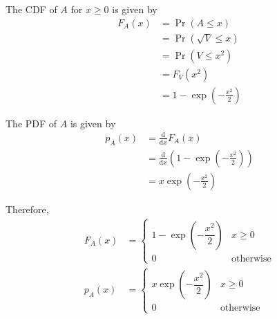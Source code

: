 \documentclass[journal,12pt,twocolumn]{IEEEtran}
\providecommand{\pr}[1]{\ensuremath{\Pr\left(#1\right)}}
\providecommand{\brak}[1]{\ensuremath{\left(#1\right)}}
\providecommand{\der}[1]{\mathrm{d} #1}
\numberwithin{equation}{section}
\renewcommand\thesection{\arabic{section}}
\begin{document}
\begin{enumerate}[label=\thesection.\arabic*,ref=\thesection.\theenumi]
	The CDF of $A$ for $x \ge 0$ is given by
	\begin{align}
		F_A(x) &= \pr{A \le x} \\
		&= \pr{\sqrt{V} \le x} \\
		&= \pr{V \le x^2} \\
		&= F_V(x^2) \\
		&= 1 - \exp\brak{-\frac{x^2}{2}}
	\end{align}
	
	The PDF of $A$ is given by
	\begin{align}
		p_A(x) &= \frac{\der{}}{\der{x}} F_A(x) \\
		&= \frac{\der{}}{\der{x}} \brak{1 - \exp\brak{-\frac{x^2}{2}}} \\
		&= x \exp\brak{-\frac{x^2}{2}}
	\end{align}
	
	Therefore,
	\begin{align}
		F_A(x) &= 
		\begin{cases}
			1 - \exp\brak{-\dfrac{x^2}{2}} & x \geq 0 \\
			0 & \text{otherwise}
		\end{cases}	\\
		p_A(x) &= 
		\begin{cases}
			x \exp\brak{-\dfrac{x^2}{2}} & x \geq 0 \\
			0 & \text{otherwise}
		\end{cases}
	\end{align}
	
	\end{enumerate}
	
\end{document}
